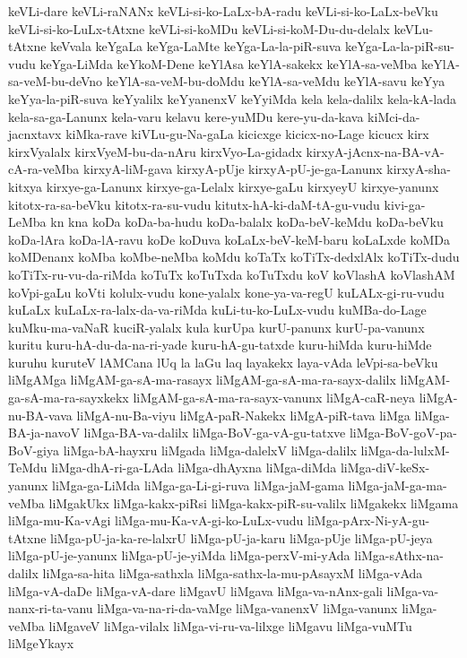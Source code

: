 {keVLi-dare
keVLi-raNANx
keVLi-si-ko-LaLx-bA-radu
keVLi-si-ko-LaLx-beVku
keVLi-si-ko-LuLx-tAtxne
keVLi-si-koMDu
keVLi-si-koM-Du-du-delalx
keVLu-tAtxne
keVvala
keYgaLa
keYga-LaMte
keYga-La-la-piR-suva
keYga-La-la-piR-su-vudu
keYga-LiMda
keYkoM-Dene
keYlAsa
keYlA-sakekx
keYlA-sa-veMba
keYlA-sa-veM-bu-deVno
keYlA-sa-veM-bu-doMdu
keYlA-sa-veMdu
keYlA-savu
keYya
keYya-la-piR-suva
keYyalilx
keYyanenxV
keYyiMda
kela
kela-dalilx
kela-kA-lada
kela-sa-ga-Lanunx
kela-varu
kelavu
kere-yuMDu
kere-yu-da-kava
kiMci-da-jacnxtavx
kiMka-rave
kiVLu-gu-Na-gaLa
kicicxge
kicicx-no-Lage
kicucx
kirx
kirxVyalalx
kirxVyeM-bu-da-nAru
kirxVyo-La-gidadx
kirxyA-jAcnx-na-BA-vA-cA-ra-veMba
kirxyA-liM-gava
kirxyA-pUje
kirxyA-pU-je-ga-Lanunx
kirxyA-sha-kitxya
kirxye-ga-Lanunx
kirxye-ga-Lelalx
kirxye-gaLu
kirxyeyU
kirxye-yanunx
kitotx-ra-sa-beVku
kitotx-ra-su-vudu
kitutx-hA-ki-daM-tA-gu-vudu
kivi-ga-LeMba
kn
kna
koDa
koDa-ba-hudu
koDa-balalx
koDa-beV-keMdu
koDa-beVku
koDa-lAra
koDa-lA-ravu
koDe
koDuva
koLaLx-beV-keM-baru
koLaLxde
koMDa
koMDenanx
koMba
koMbe-neMba
koMdu
koTaTx
koTiTx-dedxlAlx
koTiTx-dudu
koTiTx-ru-vu-da-riMda
koTuTx
koTuTxda
koTuTxdu
koV
koVlashA
koVlashAM
koVpi-gaLu
koVti
kolulx-vudu
kone-yalalx
kone-ya-va-regU
kuLALx-gi-ru-vudu
kuLaLx
kuLaLx-ra-lalx-da-va-riMda
kuLi-tu-ko-LuLx-vudu
kuMBa-do-Lage
kuMku-ma-vaNaR
kuciR-yalalx
kula
kurUpa
kurU-panunx
kurU-pa-vanunx
kuritu
kuru-hA-du-da-na-ri-yade
kuru-hA-gu-tatxde
kuru-hiMda
kuru-hiMde
kuruhu
kuruteV
lAMCana
lUq
la
laGu
laq
layakekx
laya-vAda
leVpi-sa-beVku
liMgAMga
liMgAM-ga-sA-ma-rasayx
liMgAM-ga-sA-ma-ra-sayx-dalilx
liMgAM-ga-sA-ma-ra-sayxkekx
liMgAM-ga-sA-ma-ra-sayx-vanunx
liMgA-caR-neya
liMgA-nu-BA-vava
liMgA-nu-Ba-viyu
liMgA-paR-Nakekx
liMgA-piR-tava
liMga
liMga-BA-ja-navoV
liMga-BA-va-dalilx
liMga-BoV-ga-vA-gu-tatxve
liMga-BoV-goV-pa-BoV-giya
liMga-bA-hayxru
liMgada
liMga-dalelxV
liMga-dalilx
liMga-da-lulxM-TeMdu
liMga-dhA-ri-ga-LAda
liMga-dhAyxna
liMga-diMda
liMga-diV-keSx-yanunx
liMga-ga-LiMda
liMga-ga-Li-gi-ruva
liMga-jaM-gama
liMga-jaM-ga-ma-veMba
liMgakUkx
liMga-kakx-piRsi
liMga-kakx-piR-su-valilx
liMgakekx
liMgama
liMga-mu-Ka-vAgi
liMga-mu-Ka-vA-gi-ko-LuLx-vudu
liMga-pArx-Ni-yA-gu-tAtxne
liMga-pU-ja-ka-re-lalxrU
liMga-pU-ja-karu
liMga-pUje
liMga-pU-jeya
liMga-pU-je-yanunx
liMga-pU-je-yiMda
liMga-perxV-mi-yAda
liMga-sAthx-na-dalilx
liMga-sa-hita
liMga-sathxla
liMga-sathx-la-mu-pAsayxM
liMga-vAda
liMga-vA-daDe
liMga-vA-dare
liMgavU
liMgava
liMga-va-nAnx-gali
liMga-va-nanx-ri-ta-vanu
liMga-va-na-ri-da-vaMge
liMga-vanenxV
liMga-vanunx
liMga-veMba
liMgaveV
liMga-vilalx
liMga-vi-ru-va-lilxge
liMgavu
liMga-vuMTu
liMgeYkayx
}
